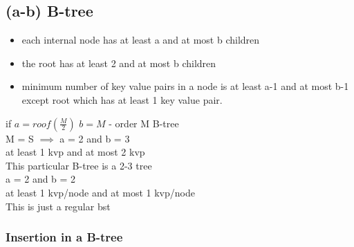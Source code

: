 \documentclass[12pt]{article}
\begin{document}
	\subsection*{(a-b) B-tree}
	\begin{itemize}
		\item each internal node has at least a and at most b children
		\item the root has at least 2 and at most b children
		\item minimum number of key value pairs in a node is at least a-1 and at most b-1 except root which has at least 1 key value pair.
	\end{itemize}
	if $a = roof(\frac{M}{2})$
	$b = M$ - order M B-tree\\
	M = S $\implies$ a = 2 and b = 3\\
	at least 1 kvp and at most 2 kvp\\
	This particular B-tree is a 2-3 tree\\
	
	a = 2 and b = 2\\
	at least 1 kvp/node and at most 1 kvp/node\\
	This is just a regular bst\\

	\subsubsection*{Insertion in a B-tree}
	
\end{document}
